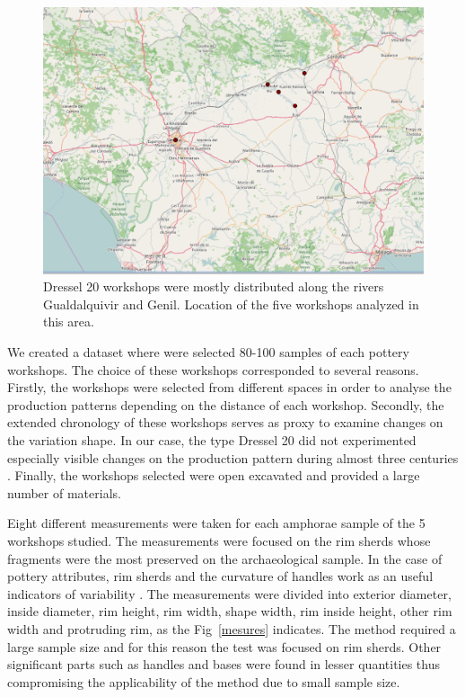 \documentclass[review]{elsarticle}
\begin{document}
\begin{figure}[htp]
	\centering
\includegraphics[scale=0.30]{romanworkshop.png}
\caption{Dressel 20 workshops were mostly distributed along the rivers Gualdalquivir and Genil. Location of the five workshops analyzed in this area.}
\label{romanworkshop}
\end{figure} 


We created a dataset where were selected 80-100 samples of each pottery workshops. The choice of these workshops corresponded to several reasons. Firstly, the workshops were selected from different spaces in order to analyse the production patterns depending on the distance of each workshop. Secondly, the extended chronology of these workshops serves as proxy to examine changes on the variation shape. In our case, the type Dressel 20 did not experimented especially visible changes on the production pattern during almost three centuries \citep{berni_dressel_2016}. Finally, the workshops selected were open excavated and provided a large number of materials.   

Eight different measurements were taken for each amphorae sample of the 5 workshops studied. The measurements were focused on the rim sherds whose fragments were the most preserved on the archaeological sample. In the case of pottery attributes, rim sherds and the curvature of handles work as an useful indicators of variability \citep{berni_millet_epigrafianforica_2008}.
The measurements were divided into exterior diameter, inside diameter, rim height, rim width, shape width, rim inside height, other rim width and protruding rim, as the Fig~\ref{mesures} indicates. The method required a large sample size and for this reason the test was focused on rim sherds. Other significant parts such as handles and bases were found in lesser quantities thus compromising the applicability of the method due to small sample size.
\end{document}
